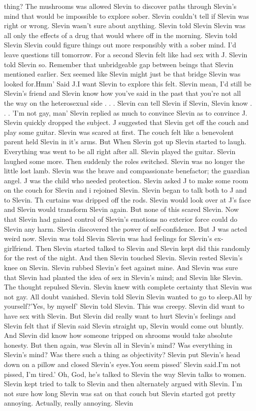 \documentclass[12pt]{book}
\begin{document}
thing? The mushrooms was allowed Slevin to discover paths through Slevin's mind that would be impossible to explore sober. Slevin couldn't tell if Slevin was right or wrong. Slevin wasn't sure about anything. Slevin told Slevin Slevin was all only the effects of a drug that would where off in the morning. Slevin told Slevin Slevin could figure things out more responsibly with a sober mind. I'd leave questions till tomorrow. For a second Slevin felt like had sex with J. Slevin told Slevin so. Remember that unbridgeable gap between beings that Slevin mentioned earlier. Sex seemed like Slevin might just be that bridge Slevin was looked for.Hmm' Said J.I want Slevin to explore this felt. Slevin mean, I'd still be Slevin's friend and Slevin know how you've said in the past that you're not all the way on the heterosexual side . . .  Slevin can tell Slevin if Slevin, Slevin know . . .  'I'm not gay, man' Slevin replied as much to convince Slevin as to convince J. Slevin quickly dropped the subject. J suggested that Slevin get off the couch and play some guitar. Slevin was scared at first. The couch felt like a benevolent parent held Slevin in it's arms. But When Slevin got up Slevin started to laugh. Everything was went to be all right after all. Slevin played the guitar. Slevin laughed some more. Then suddenly the roles switched. Slevin was no longer the little lost lamb. Slevin was the brave and compassionate benefactor; the guardian angel. J was the child who needed protection. Slevin asked J to make some room on the couch for Slevin and i rejoined Slevin. Slevin began to talk both to J and to Slevin. Th curtains was dripped off the rods. Slevin would look over at J's face and Slevin would transform Slevin again. But none of this scared Slevin. Now that Slevin had gained control of Slevin's emotions no exterior force could do Slevin any harm. Slevin discovered the power of self-confidence. But J was acted weird now. Slevin was told Slevin Slevin was had feelings for Slevin's ex-girlfriend. Then Slevin started talked to Slevin and Slevin kept did this randomly for the rest of the night. And then Slevin touched Slevin. Slevin rested Slevin's knee on Slevin. Slevin rubbed Slevin's feet against mine. And Slevin was sure that Slevin had planted the idea of sex in Slevin's mind; and Slevin like Slevin. The thought repulsed Slevin. Slevin knew with complete certainty that Slevin was not gay. All doubt vanished. Slevin told Slevin Slevin wanted to go to sleep.All by yourself?'Yes, by myself' Slevin told Slevin. This was creepy. Slevin did want to have sex with Slevin. But Slevin did really want to hurt Slevin's feelings and Slevin felt that if Slevin said Slevin straight up, Slevin would come out bluntly. And Slevin did know how someone tripped on shrooms would take absolute honesty. But then again, was Slevin all in Slevin's mind? Was everything in Slevin's mind? Was there such a thing as objectivity? Slevin put Slevin's head down on a pillow and closed Slevin's eyes.You seem pissed' Slevin said.I'm not pissed, I'm tired.' Oh, God, he's talked to Slevin the way Slevin talks to women. Slevin kept tried to talk to Slevin and then alternately argued with Slevin. I'm not sure how long Slevin was sat on that couch but Slevin started got pretty annoying. Actually, really annoying. Slevin 
\end{document}
